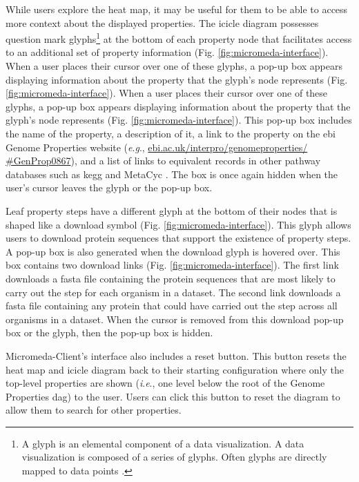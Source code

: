While users explore the heat map, it may be useful for them to be able to access 
more context about the displayed properties. The icicle diagram possesses 
question mark glyphs\footnote{A glyph is an elemental component of a data 
visualization. A data visualization is composed of a series of glyphs. Often 
glyphs are directly mapped to data points \cite{chen}.} at the bottom of each 
property node that facilitates access to an additional set of property 
information (Fig. \ref{fig:micromeda-interface}). When a user places their 
cursor over one of these glyphs, a pop-up box appears displaying information 
about the property that the glyph's node represents (Fig. 
\ref{fig:micromeda-interface}). When a user places their cursor over one of 
these glyphs, a pop-up box appears displaying information about the property 
that the glyph's node represents (Fig. \ref{fig:micromeda-interface}). This 
pop-up box includes the name of the property, a description of it, a link to the 
property on the \gls{ebi}  Genome Properties website (\textit{e}.\textit{g}., 
\href{https://www.ebi.ac.uk/interpro/genomeproperties/#GenProp0867}{ebi.ac.uk/interpro/genomeproperties/ 
\#GenProp0867}), and a list of links to equivalent records in other pathway 
databases such as \gls{kegg} \cite{kanehisa2000kegg} and MetaCyc 
\cite{karp2002metacyc}. The box is once again hidden when the user's cursor 
leaves the glyph or the pop-up box.

Leaf property steps have a different glyph at the bottom of their nodes that is 
shaped like a download symbol (Fig. \ref{fig:micromeda-interface}). This glyph 
allows users to download protein sequences that support the existence of 
property steps. A pop-up box is also generated when the download glyph is 
hovered over. This box contains two download links (Fig. 
\ref{fig:micromeda-interface}). The first link downloads a \gls{fasta} file 
containing the protein sequences that are most likely to carry out the step for 
each organism in a dataset. The second link downloads a \gls{fasta} file 
containing any protein that could have carried out the step across all organisms 
in a dataset. When the cursor is removed from this download pop-up box or the 
glyph, then the pop-up box is hidden.

Micromeda-Client's interface also includes a reset button. This button resets 
the heat map and icicle diagram back to their starting configuration where only 
the top-level properties are shown (\textit{i}.\textit{e}., one level below the root of the Genome 
Properties \gls{dag}) to the user. Users can click this button to reset the 
diagram to allow them to search for other properties.

